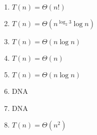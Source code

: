 \documentclass[../main.tex]{subfiles}
\begin{document}
\begin{enumerate}
    \item $T(n) = \Theta(n!)$
    
    \item $T(n) = \Theta(n^{\log_2{3}} \log n)$
    
    \item $T(n) = \Theta(n \log n)$
    
    \item $T(n) = \Theta(n)$

    \item $T(n) = \Theta(n \log n)$

    \item DNA

    \item DNA

    \item $T(n) = \Theta(n^2)$
\end{enumerate}
\end{document}
